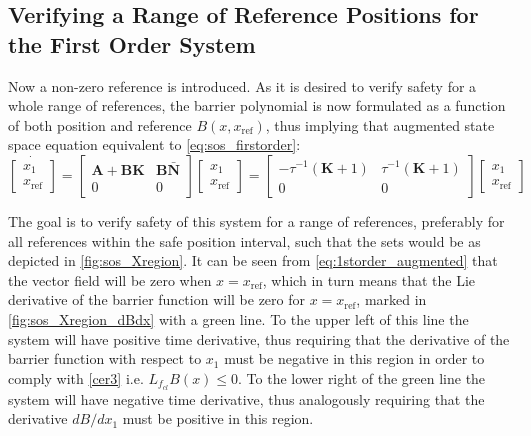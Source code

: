 \subsection{Verifying a Range of Reference Positions for the First Order System}\label{sec:sos_1storder_references}

Now a non-zero reference is introduced. As it is desired to verify safety for a whole range of references, the barrier polynomial is now formulated as a function of both position and reference $B(x,x_\text{ref})$, thus implying that augmented state space equation equivalent to \autoref{eq:sos_firstorder}: 
\begin{equation}
\dot{\begin{bmatrix}
x_1\\x_\text{ref}
\end{bmatrix}} 
= \begin{bmatrix}
\mathbf{A}+\textbf{BK} & \textbf{B}\bar{\mathbf{N}}\\
0 & 0
\end{bmatrix}
\begin{bmatrix}
x_1\\x_\text{ref}
\end{bmatrix}
= \begin{bmatrix}
-\tau^{-1}(\mathbf{K}+1) & \tau^{-1}(\mathbf{K}+1)\\
0 & 0
\end{bmatrix}
\begin{bmatrix}
x_1\\x_\text{ref}
\end{bmatrix}
\label{eq:1storder_augmented}
\end{equation}

The goal is to verify safety of this system for a range of references, preferably for all references within the safe position interval, such that the sets would be as depicted in \autoref{fig:sos_Xregion}.
It can be seen from \autoref{eq:1storder_augmented} that the vector field will be zero when $x=x_\text{ref}$, which in turn means that the Lie derivative of the barrier function will be zero for $x=x_\text{ref}$, marked in \autoref{fig:sos_Xregion_dBdx} with a green line. To the upper left of this line the system will have positive time derivative, thus requiring that the derivative of the barrier function with respect to $x_1$ must be negative in this region in order to comply with \autoref{cer3} i.e. $L_{f_{cl}}B(x) \leq 0$. To the lower right of the green line the system will have negative time derivative, thus analogously requiring that the derivative $dB/dx_1$ must be positive in this region.

